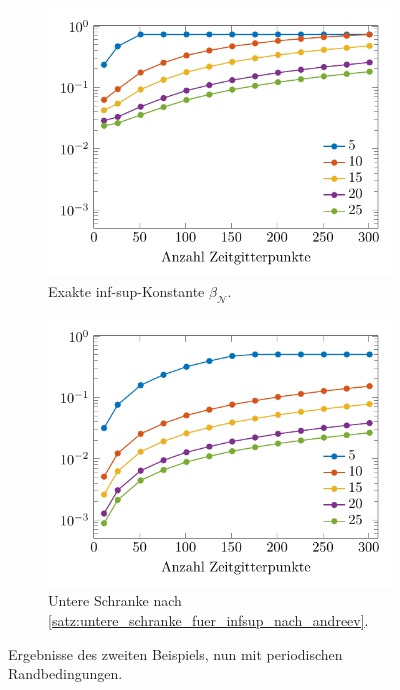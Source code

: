 \documentclass[../main.tex]{subfiles}
\begin{document}
\begin{figure}[tb!]
    \centering
    \centering
    \begin{subfigure}[b]{0.495\textwidth}
        \centering
        \includegraphics[width=1\textwidth]{figures/chapter4/stability_fourier_dataset1_fig_1.pdf}
        \caption{Exakte inf-sup-Konstante $\beta_{\mathcal N}$.}
    \end{subfigure}
    \begin{subfigure}[b]{0.495\textwidth}
        \centering
        \includegraphics[width=1\textwidth]{figures/chapter4/stability_fourier_dataset1_fig_2.pdf}
        \caption{Untere Schranke nach \cref{satz:untere_schranke_fuer_infsup_nach_andreev}.}
    \end{subfigure}
    \caption[Stabilität der Diskretisierung mit periodisches Randbedingungen.]{%
        Ergebnisse des zweiten Beispiels, nun mit periodischen Randbedingungen.
        }
    \label{figure:infsup_periodisch_zwei_felder}
\end{figure}
\end{document}
